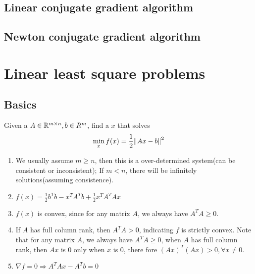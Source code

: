 \begin{refsection}
\subsection{Linear conjugate gradient algorithm}




\subsection{Newton conjugate gradient algorithm}




\section{Linear least square problems}
\subsection{Basics}
\begin{definition}
	Given a $A\in \mathbb{R}^{m\times n}, b\in R^m$, find a $x$ that solves 
	$$\min_x f(x) = \frac{1}{2}\norm{Ax-b}^2$$
\end{definition}
\begin{remark}\hfill
	\begin{enumerate}
		\item We usually assume $m \geq n$, then this is a over-determined system(can be consistent or inconsistent); If $m < n$, there will be infinitely solutions(assuming consistence).
		\item $f(x) = \frac{1}{2}b^Tb - x^TA^Tb + \frac{1}{2}x^TA^TAx$
		\item $f(x)$ is convex, since for any matrix $A$, we always have $A^TA \geq 0$.
		\item If $A$ has full column rank, then $A^TA > 0$, indicating $f$ is strictly convex. Note that for any matrix $A$, we always have $A^TA \geq 0$, when $A$ has full column rank, then $Ax$ is 0 only when $x$ is 0, there fore $(Ax)^T(Ax) >0,\forall x\neq 0$.  
		\item $\nabla f = 0 \Rightarrow A^TAx - A^Tb = 0$
	\end{enumerate}
\end{remark}



\end{refsection}

